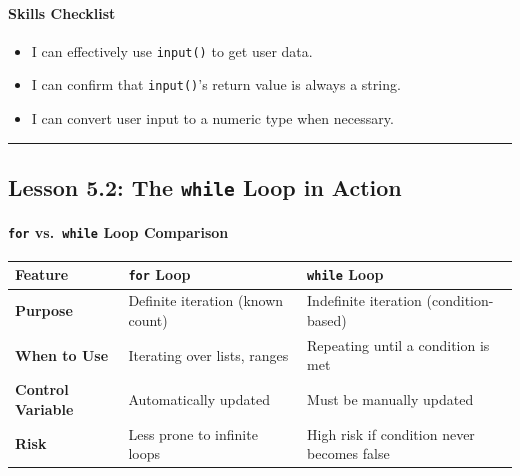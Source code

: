 \documentclass[
  justified,
  openright,
]{tufte-book}
\let\subsubsection\paragraph
\let\paragraph\paragraph
\let\subsubsection\paragraph
\let\paragraph\paragraph
\providecommand{\tightlist}{%
  \setlength{\itemsep}{0pt}\setlength{\parskip}{0pt}}
\begin{document}
\subsubsection{Skills Checklist}\label{skills-checklist-22}

\begin{itemize}
\tightlist
\item[$\square$]
  I can effectively use \texttt{input()} to get user data.
\item[$\square$]
  I can confirm that \texttt{input()}'s return value is always a string.
\item[$\square$]
  I can convert user input to a numeric type when necessary.
\end{itemize}

\begin{center}\rule{0.5\linewidth}{0.5pt}\end{center}

\subsection{\texorpdfstring{Lesson 5.2: The \texttt{while} Loop in
Action}{Lesson 5.2: The while Loop in Action}}\label{lesson-5.2-the-while-loop-in-action}

\subsubsection{\texorpdfstring{\texttt{for} vs.~\texttt{while} Loop
Comparison}{for vs.~while Loop Comparison}}\label{for-vs.-while-loop-comparison}

{\def\LTcaptype{none} %
\begin{longtable}[]{@{}
  >{\raggedright\arraybackslash}p{}
  >{\raggedright\arraybackslash}p{}
  >{\raggedright\arraybackslash}p{}@{}}
\toprule\noalign{}
\begin{minipage}[b]{\linewidth}\raggedright
Feature
\end{minipage} & \begin{minipage}[b]{\linewidth}\raggedright
\texttt{for} Loop
\end{minipage} & \begin{minipage}[b]{\linewidth}\raggedright
\texttt{while} Loop
\end{minipage} \\
\midrule\noalign{}
\endhead
\bottomrule\noalign{}
\endlastfoot
\textbf{Purpose} & Definite iteration (known count) & Indefinite
iteration (condition-based) \\
\textbf{When to Use} & Iterating over lists, ranges & Repeating until a
condition is met \\
\textbf{Control Variable} & Automatically updated & Must be manually
updated \\
\textbf{Risk} & Less prone to infinite loops & High risk if condition
never becomes false \\
\end{longtable}
}
\end{document}
